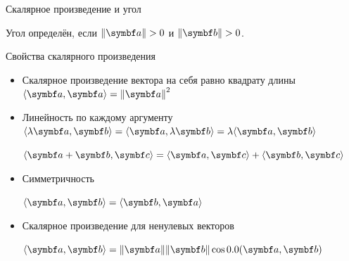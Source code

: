 \begin{frame}{Скалярное произведение и угол}
\begin{minipage}{0.3\textwidth}
\begin{tikzpicture}[
scale=1.2,
MyPoints/.style={draw=blue,fill=white,thick},
Segments/.style={draw=blue!50!red!70,thick},
MyCircles/.style={green!50!blue!50,thin}, 
every node/.style={scale=1.2}
]


\end{tikzpicture}
\end{minipage}
\begin{minipage}{0.69\textwidth}
Угол определён, если $\norm{\ba} > 0$ и $\norm{\bb} > 0$.  
\end{minipage}
  




  


\end{frame}





\begin{frame}{Свойства скалярного произведения}

  
  \begin{itemize}[<+->]
  \item Скалярное произведение вектора на себя равно квадрату длины
  $\langle \ba, \ba \rangle = \norm{\ba}^2$

  \item Линейность по каждому аргументу
  $\langle \lambda \ba, \bb \rangle = \langle \ba,  \lambda  \bb \rangle = \lambda  \langle \ba,  \bb \rangle$

  $\langle \ba + \bb, \bc \rangle = \langle \ba , \bc \rangle + \langle \bb , \bc \rangle$

  \item Симметричность
  
  $\langle \ba, \bb \rangle = \langle \bb, \ba \rangle$

  \item Скалярное произведение для ненулевых векторов
  
  $\langle \ba, \bb \rangle = \norm{\ba}\norm{\bb} \cos \angle(\ba, \bb)$
  \end{itemize}
  
  

\end{frame}




